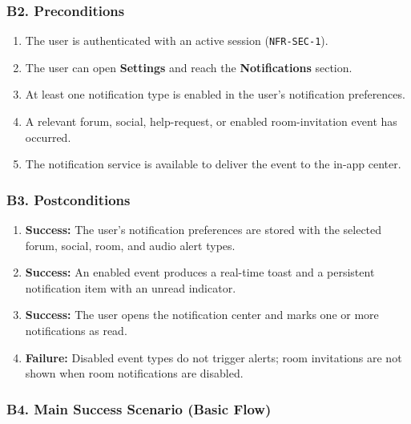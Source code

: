 \documentclass[12pt]{article}
\begin{document}
\subsubsection*{B2. Preconditions}
\par\medskip

\begin{enumerate}
\item The user is authenticated with an active session (\texttt{NFR-SEC-1}).
\item The user can open \textbf{Settings} and reach the \textbf{Notifications} section.
\item At least one notification type is enabled in the user's notification preferences.
\item A relevant forum, social, help-request, or enabled room-invitation event has occurred.
\item The notification service is available to deliver the event to the in-app center.
\end{enumerate}
\par\medskip

\hypertarget{sec:b3-postconditions}{}
\subsubsection*{B3. Postconditions}
\par\medskip

\begin{enumerate}
\item \textbf{Success:} The user's notification preferences are stored with the selected forum, social, room, and audio alert types.
\item \textbf{Success:} An enabled event produces a real-time toast and a persistent notification item with an unread indicator.
\item \textbf{Success:} The user opens the notification center and marks one or more notifications as read.
\item \textbf{Failure:} Disabled event types do not trigger alerts; room invitations are not shown when room notifications are disabled.
\end{enumerate}
\par\medskip

\hypertarget{sec:b4-main-success-scenario-basic-flow}{}
\subsubsection*{B4. Main Success Scenario (Basic Flow)}
\par\medskip
\end{document}
